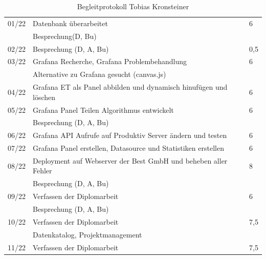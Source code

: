 \begin{table}[h]
\begin{tabular}{|l|l|l|}
		
		
		
		01/22   & Datenbank überarbeitet & 6	\\ 
	&Besprechung(D, Bu) & \\	\hline
		
		
		
		
		02/22   & Besprechung (D, A, Bu)  & 0,5	\\ \hline
		
		
		03/22   & Grafana Recherche, Grafana Problembehandlung  & 6	\\
		
			&Alternative zu Grafana gesucht (canvas.js)& \\
		
		 \hline
		
		
		
		
		
		
		04/22   & Grafana ET als Panel abbilden und dynamisch hinufügen und löschen & 6	\\ \hline
		
		
		05/22   & Grafana Panel Teilen Algorithmus entwickelt & 6	\\ 
		
	&Besprechung (D, A, Bu)& \\	\hline
		
		
		06/22   & Grafana API Aufrufe auf Produktiv Server ändern und testen& 6	\\ \hline
		
		
		
		07/22   & Grafana Panel erstellen, Datasource und Statistiken erstellen  & 6 \\ \hline
		
		
		
		08/22   &Deployment auf Webserver der Best GmbH und beheben aller Fehler & 8 \\
			& Besprechung (D, A, Bu) &	\\ \hline
		
		
		
		
		
		
		
		
		09/22   &Verfassen der Diplomarbeit& 6 \\ 
		& Besprechung (D, A, Bu) &	\\ \hline
		
		
		
		
		10/22   &Verfassen der Diplomarbeit& 7,5\\ 
			& Datenkatalog, Projektmanagement &	\\ \hline
			
					11/22   &Verfassen der Diplomarbeit& 7,5\\  \hline
			
		
	
		
	
		
		
		
		
		
	\end{tabular}
	\caption{Begleitprotokoll Tobias Kronsteiner}
\label{tab:Begleitprotokoll Tobias Kronsteiner}
\end{table}
\newpage
